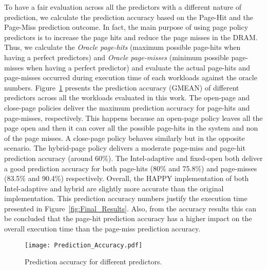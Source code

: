 To have a fair evaluation across all the predictors with a different nature of prediction, we calculate the prediction accuracy based on the Page-Hit and the Page-Miss prediction outcome. In fact, the main purpose of using page policy predictors is to increase the page hits and reduce the page misses in the DRAM. Thus, we calculate the \textit{Oracle page-hits} (maximum possible page-hits when having a perfect predictors) and \textit{Oracle page-misses} (minimum possible page-misses when having a perfect predictor) and evaluate the actual page-hits and page-misses occurred during execution time of each workloads against the oracle numbers. Figure~\ref{fig:Accuracy_graph} presents the prediction accuracy (GMEAN) of different predictors across all the workloads evaluated in this work. The open-page and close-page policies deliver the maximum prediction accuracy for page-hits and page-misses, respectively. This happens because an open-page policy leaves all the page open and then it can cover all the possible page-hits in the system and non of the page misses. A close-page policy behaves similarly but in the opposite scenario.
The hybrid-page policy delivers a moderate page-miss and page-hit prediction accuracy (around 60\%). The Intel-adaptive and fixed-open both deliver a good prediction accuracy for both page-hits (80\% and 75.8\%) and page-misses (83.5\% and 90.4\%) respectively. Overall, the HAPPY implementation of both Intel-adaptive and hybrid are slightly more accurate than the original implementation. This prediction accuracy numbers justify the execution time presented in Figure~\ref{fig:Final_Results}. Also, from the accuracy results this can be concluded that the page-hit prediction accuracy has a higher impact on the overall execution time than the page-miss prediction accuracy. 





\begin{figure}[!htb]
\centering
\texttt{[image: Prediction\_Accuracy.pdf]}
\caption{Prediction accuracy for different predictors.}
\label{fig:Accuracy_graph}
\end{figure}


